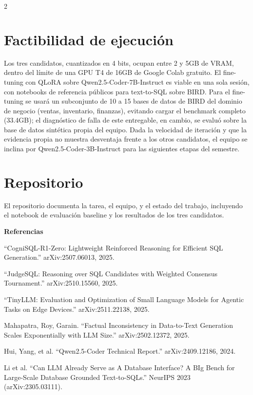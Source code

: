 \documentclass[10pt]{article}
\begin{document}
\begin{multicols}{2}
\section{Factibilidad de ejecuci\'on}
Los tres candidatos, cuantizados en 4 bits, ocupan entre 2 y 5GB de VRAM, dentro del l\'imite de una GPU T4 de 16GB de Google Colab gratuito. El fine-tuning con QLoRA sobre Qwen2.5-Coder-7B-Instruct es viable en una sola sesi\'on, con notebooks de referencia p\'ublicos para text-to-SQL sobre BIRD. Para el fine-tuning se usar\'a un subconjunto de 10 a 15 bases de datos de BIRD del dominio de negocio (ventas, inventario, finanzas), evitando cargar el benchmark completo (33.4GB); el diagn\'ostico de falla de este entregable, en cambio, se evalu\'o sobre la base de datos sint\'etica propia del equipo. Dada la velocidad de iteraci\'on y que la evidencia propia no muestra desventaja frente a los otros candidatos, el equipo se inclina por Qwen2.5-Coder-3B-Instruct para las siguientes etapas del semestre.

\section{Repositorio}
El repositorio documenta la tarea, el equipo, y el estado del trabajo, incluyendo el notebook de evaluaci\'on baseline y los resultados de los tres candidatos.

\vfill
\begin{footnotesize}
\textbf{Referencias}
\begin{enumerate}[leftmargin=1.1em, label={[\arabic*]}, itemsep=0pt, topsep=1pt, parsep=0pt]
\item ``CogniSQL-R1-Zero: Lightweight Reinforced Reasoning for Efficient SQL Generation.'' arXiv:2507.06013, 2025.
\item ``JudgeSQL: Reasoning over SQL Candidates with Weighted Consensus Tournament.'' arXiv:2510.15560, 2025.
\item ``TinyLLM: Evaluation and Optimization of Small Language Models for Agentic Tasks on Edge Devices.'' arXiv:2511.22138, 2025.
\item Mahapatra, Roy, Garain. ``Factual Inconsistency in Data-to-Text Generation Scales Exponentially with LLM Size.'' arXiv:2502.12372, 2025.
\item Hui, Yang, et al. ``Qwen2.5-Coder Technical Report.'' arXiv:2409.12186, 2024.
\item Li et al. ``Can LLM Already Serve as A Database Interface? A BIg Bench for Large-Scale Database Grounded Text-to-SQLs.'' NeurIPS 2023 (arXiv:2305.03111).
\end{enumerate}
\end{footnotesize}

\end{multicols}
\end{document}
